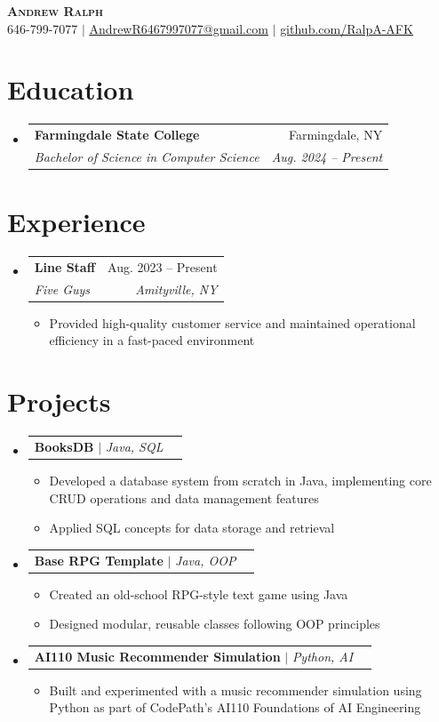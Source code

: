 \documentclass[letterpaper,11pt]{article}
\makeatletter
\newcommand{\resumeItem}[1]{
  \item\small{
    {#1 \vspace{-2pt}}
  }
}
\newcommand{\resumeSubheading}[4]{
  \vspace{-2pt}\item
    \begin{tabular*}{0.97\textwidth}[t]{l@{\extracolsep{\fill}}r}
      \textbf{#1} & #2 \\
      \textit{\small#3} & \textit{\small #4} \\
    \end{tabular*}\vspace{-7pt}
}
\newcommand{\resumeProjectHeading}[2]{
    \item
    \begin{tabular*}{0.97\textwidth}{l@{\extracolsep{\fill}}r}
      \small#1 & #2 \\
    \end{tabular*}\vspace{-7pt}
}
\newcommand{\resumeSubHeadingListStart}{\begin{itemize}[leftmargin=0.15in, label={}]}
\newcommand{\resumeSubHeadingListEnd}{\end{itemize}}
\newcommand{\resumeItemListStart}{\begin{itemize}}
\newcommand{\resumeItemListEnd}{\end{itemize}\vspace{-5pt}}
\makeatother
\begin{document}

\begin{center}
    \textbf{\Huge \scshape Andrew Ralph} \\ \vspace{1pt}
    \small 646-799-7077 $|$ \href{mailto:AndrewR6467997077@gmail.com}{\underline{AndrewR6467997077@gmail.com}} $|$
    \href{https://github.com/RalpA-AFK}{\underline{github.com/RalpA-AFK}}
\end{center}


\section{Education}
  \resumeSubHeadingListStart
    \resumeSubheading
      {Farmingdale State College}{Farmingdale, NY}
      {Bachelor of Science in Computer Science}{Aug. 2024 -- Present}
  \resumeSubHeadingListEnd


\section{Experience}
  \resumeSubHeadingListStart
    \resumeSubheading
      {Line Staff}{Aug. 2023 -- Present}
      {Five Guys}{Amityville, NY}
      \resumeItemListStart
        \resumeItem{Provided high-quality customer service and maintained operational efficiency in a fast-paced environment}
      \resumeItemListEnd
  \resumeSubHeadingListEnd


\section{Projects}
\resumeSubHeadingListStart
  \resumeProjectHeading
      {\textbf{BooksDB} $|$ \emph{Java, SQL}}{}
      \resumeItemListStart
        \resumeItem{Developed a database system from scratch in Java, implementing core CRUD operations and data management features}
        \resumeItem{Applied SQL concepts for data storage and retrieval}
      \resumeItemListEnd
  \resumeProjectHeading
      {\textbf{Base RPG Template} $|$ \emph{Java, OOP}}{}
      \resumeItemListStart
        \resumeItem{Created an old-school RPG-style text game using Java}
        \resumeItem{Designed modular, reusable classes following OOP principles}
      \resumeItemListEnd
  \resumeProjectHeading
      {\textbf{AI110 Music Recommender Simulation} $|$ \emph{Python, AI}}{}
      \resumeItemListStart
        \resumeItem{Built and experimented with a music recommender simulation using Python as part of CodePath’s AI110 Foundations of AI Engineering}
      \resumeItemListEnd
\resumeSubHeadingListEnd
\end{document}

